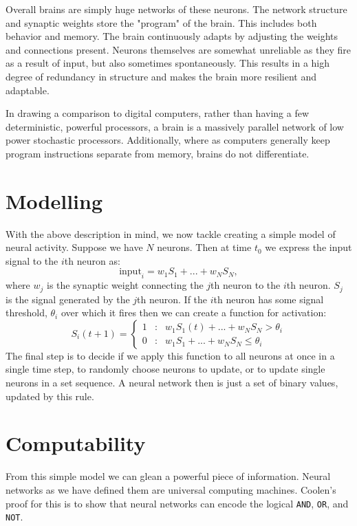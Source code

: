 \documentclass[]{article}
\theoremstyle{plain}
\theoremstyle{definition}
\begin{document}
Overall brains are simply huge networks of these neurons. The network structure and synaptic weights store the "program" of the brain. This includes both behavior and memory. The brain continuously adapts by adjusting the weights and connections present. Neurons themselves are somewhat unreliable as they fire as a result of input, but also sometimes spontaneously. This results in a high degree of redundancy in structure and makes the brain more resilient and adaptable. 
 
In drawing a comparison to digital computers, rather than having a few deterministic, powerful processors, a brain is a massively parallel network of low power stochastic processors. Additionally, where as computers generally keep program instructions separate from memory, brains do not differentiate.

\section{Modelling}
With the above description in mind, we now tackle creating a simple model of neural activity. Suppose we have $ N $ neurons. Then at time $ t_0 $ we express the input signal to the $ i $th neuron as: 
\[ \text{input}_i = w_1S_1 + ... + w_NS_N,\] 
where $ w_j $ is the synaptic weight connecting the $ j $th neuron to the $ i $th neuron. $ S_j $ is the signal generated by the $ j $th neuron. If the $ i $th neuron has some signal threshold, $ \theta_i $ over which it fires then we can create a function for activation:
\[ S_i(t+1) = \left\{\begin{array}{lcr}
1 &:& w_1S_1(t) + ... + w_NS_N > \theta_i\\
0 &:& w_1S_1 + ... + w_NS_N \leq \theta_i
\end{array}\right. \]
The final step is to decide if we apply this function to all neurons at once in a single time step, to randomly choose neurons to update, or to update single neurons in a set sequence. A neural network then is just a set of binary values, updated by this rule.

\section{Computability} 
From this simple model we can glean a powerful piece of information. Neural networks as we have defined them are universal computing machines. Coolen's proof for this is to show that neural networks can encode the logical \texttt{AND}, \texttt{OR}, and \texttt{NOT}.
\end{document}
